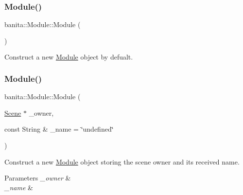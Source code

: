 \subsubsection{\texorpdfstring{Module()}{Module()}\hspace{0.1cm}{\footnotesize\ttfamily [1/2]}}
{\footnotesize\ttfamily banita\+::\+Module\+::\+Module (\begin{DoxyParamCaption}{ }\end{DoxyParamCaption})\hspace{0.3cm}{\ttfamily [protected]}}



Construct a new \mbox{\hyperlink{classbanita_1_1_module}{Module}} object by defualt. 

\mbox{\label{classbanita_1_1_module_a5432095b67b68582d293af3a2c106a73}} 
\subsubsection{\texorpdfstring{Module()}{Module()}\hspace{0.1cm}{\footnotesize\ttfamily [2/2]}}
{\footnotesize\ttfamily banita\+::\+Module\+::\+Module (\begin{DoxyParamCaption}\item[{\mbox{\hyperlink{classbanita_1_1_scene}{Scene}} $\ast$}]{\+\_\+owner,  }\item[{const String \&}]{\+\_\+name = {\ttfamily \char`\"{}undefined\char`\"{}} }\end{DoxyParamCaption})\hspace{0.3cm}{\ttfamily [protected]}}



Construct a new \mbox{\hyperlink{classbanita_1_1_module}{Module}} object storing the scene owner and it\textquotesingle{}s received name. 


\begin{DoxyParams}{Parameters}
{\em \+\_\+owner} & \\
\hline
{\em \+\_\+name} & \\
\hline
\end{DoxyParams}
\mbox{\label{classbanita_1_1_module_a54299f4573f04a87251805de43f3f3b4}} 
